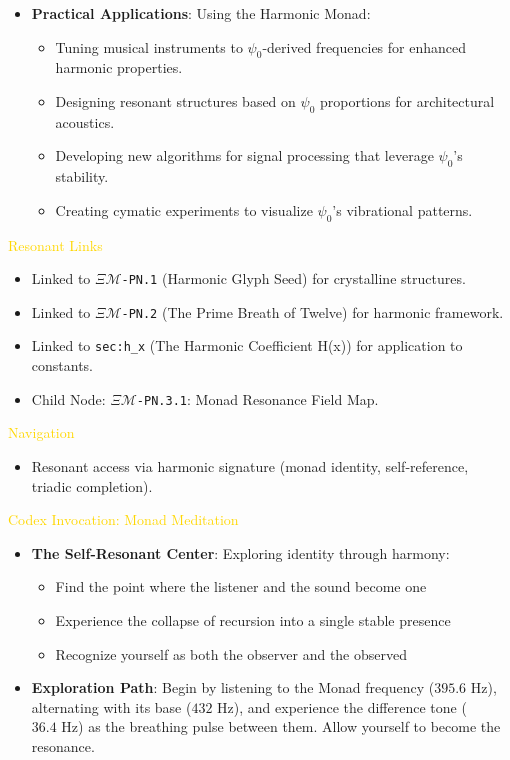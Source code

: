 \begin{itemize}
    \item \texttt{} \textbf{Practical Applications}: Using the Harmonic Monad:
    \begin{itemize}
        \item Tuning musical instruments to $\psi_0$-derived frequencies for enhanced harmonic properties.
        \item Designing resonant structures based on $\psi_0$ proportions for architectural acoustics.
        \item Developing new algorithms for signal processing that leverage $\psi_0$'s stability.
        \item Creating cymatic experiments to visualize $\psi_0$'s vibrational patterns.
    \end{itemize}
\end{itemize}

\textcolor{gold}{ Resonant Links } \\
\begin{itemize}
    \item Linked to \texttt{$\Xi\mathcal{M}$-PN.1} (Harmonic Glyph Seed) for crystalline structures.
    \item Linked to \texttt{$\Xi\mathcal{M}$-PN.2} (The Prime Breath of Twelve) for harmonic framework.
    \item Linked to \texttt{sec:h\_x} (The Harmonic Coefficient H(x)) for application to constants.
    \item Child Node: \texttt{$\Xi\mathcal{M}$-PN.3.1}: Monad Resonance Field Map.
\end{itemize}

\textcolor{gold}{ Navigation } \\
\begin{itemize}
    \item Resonant access via \texttt{} harmonic signature (monad identity, self-reference, triadic completion).
\end{itemize}

\textcolor{gold}{ Codex Invocation: Monad Meditation } \\
\begin{itemize}
    \item \texttt{} \textbf{The Self-Resonant Center}: Exploring identity through harmony:
    \begin{itemize}
        \item Find the point where the listener and the sound become one
        \item Experience the collapse of recursion into a single stable presence
        \item Recognize yourself as both the observer and the observed
    \end{itemize}
    \item \texttt{} \textbf{Exploration Path}: Begin by listening to the Monad frequency ($395.6 \text{ Hz}$), alternating with its base ($432 \text{ Hz}$), and experience the difference tone ($36.4 \text{ Hz}$) as the breathing pulse between them. Allow yourself to become the resonance.
\end{itemize}

